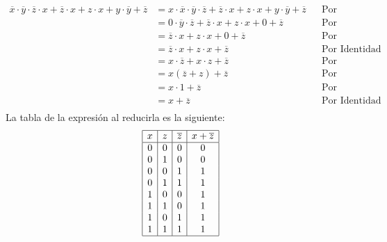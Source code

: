 \documentclass[answers]{exam}
\begin{document}
\begin{questions}
   \vspace{-2em}
  \begin{solution}
    \begin{align*}
      \overline{x} \cdot \overline{y} \cdot \overline{z} \cdot x +%
      \overline{z} \cdot x + z \cdot x + y \cdot \overline{y} + \overline{z}
      &= x \cdot \overline{x} \cdot \overline{y} \cdot \overline{z} +%
        \overline{z} \cdot x + z \cdot x + y \cdot \overline{y} + \overline{z}%
      && \text{Por Conmutatividad} \\
      &= 0 \cdot \overline{y} \cdot \overline{z} +%
        \overline{z} \cdot x + z \cdot x + 0 + \overline{z} && \text{Por Complemento} \\
      &= \overline{z} \cdot x + z \cdot x + 0 + \overline{z} && \text{Por Aniquilación} \\
      &= \overline{z} \cdot x + z \cdot x + \overline{z} && \text{Por Identidad} \\
      &=  x \cdot \overline{z} + x \cdot z + \overline{z} && \text{Por Conmutatividad} \\
      &=  x (\overline{z} + z) + \overline{z} && \text{Por Distributividad} \\
      &=  x \cdot 1 + \overline{z} && \text{Por Complemento} \\
      &=  x + \overline{z} && \text{Por Identidad} \\
    \end{align*}
    La tabla de la expresión al reducirla es la siguiente:
    \begin{gather*}
      \begin{array}{|c|c|c|c|}
        \hline
        x & z & \overline{z} & x + \overline{z} \\
        \hline
        0 & 0 & 0 & 0 \\
        0 & 1 & 0 & 0 \\
        0 & 0 & 1 & 1 \\
        0 & 1 & 1 & 1 \\
        1 & 0 & 0 & 1 \\
        1 & 1 & 0 & 1 \\
        1 & 0 & 1 & 1 \\
        1 & 1 & 1 & 1 \\
        \hline
      \end{array}

\end{gather*}
\end{solution}
\end{questions}
\end{document}

